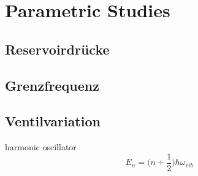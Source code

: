 \chapter{Parametric Studies}
\label{cha:paramstudies}


\section{Reservoirdrücke}
\label{sec:reservoir}

\section{Grenzfrequenz}
\label{sec:cutofffreq}

\section{Ventilvariation}
\label{sec:ventil}



harmonic oscillator
\begin{equation} \label{eq:harmonicoszillator}
E_n = \Biggl(n+\frac{1}{2} \Biggr)\hbar\omega_{vib}
\end{equation}
